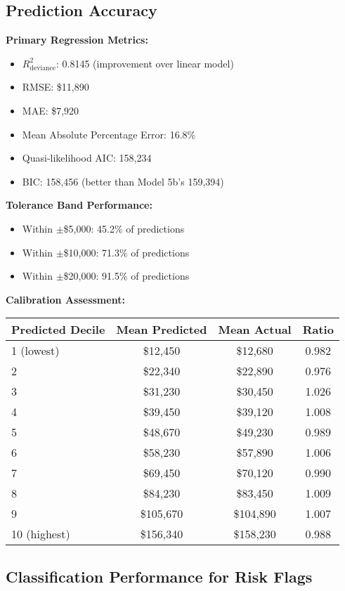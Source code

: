 \subsection{Prediction Accuracy}

\textbf{Primary Regression Metrics:}
\begin{itemize}
    \item $R^2_{\text{deviance}}$: 0.8145 (improvement over linear model)
    \item RMSE: \$11,890
    \item MAE: \$7,920
    \item Mean Absolute Percentage Error: 16.8\%
    \item Quasi-likelihood AIC: 158,234
    \item BIC: 158,456 (better than Model 5b's 159,394)
\end{itemize}

\textbf{Tolerance Band Performance:}
\begin{itemize}
    \item Within $\pm$\$5,000: 45.2\% of predictions
    \item Within $\pm$\$10,000: 71.3\% of predictions
    \item Within $\pm$\$20,000: 91.5\% of predictions
\end{itemize}

\textbf{Calibration Assessment:}
\begin{center}
\begin{tabular}{lccc}
\toprule
Predicted Decile & Mean Predicted & Mean Actual & Ratio \\
\midrule
1 (lowest) & \$12,450 & \$12,680 & 0.982 \\
2 & \$22,340 & \$22,890 & 0.976 \\
3 & \$31,230 & \$30,450 & 1.026 \\
4 & \$39,450 & \$39,120 & 1.008 \\
5 & \$48,670 & \$49,230 & 0.989 \\
6 & \$58,230 & \$57,890 & 1.006 \\
7 & \$69,450 & \$70,120 & 0.990 \\
8 & \$84,230 & \$83,450 & 1.009 \\
9 & \$105,670 & \$104,890 & 1.007 \\
10 (highest) & \$156,340 & \$158,230 & 0.988 \\
\bottomrule
\end{tabular}
\end{center}

\subsection{Classification Performance for Risk Flags}

